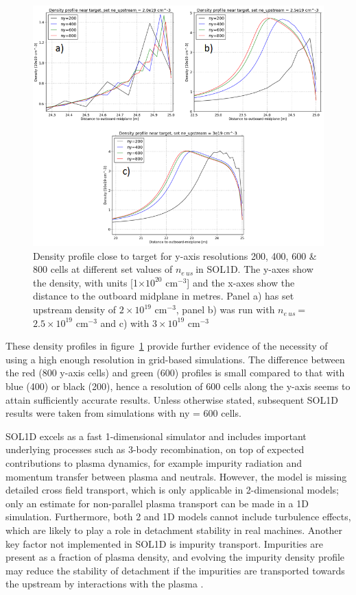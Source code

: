 \documentclass[12pt]{article}  %
\providecommand{\e}[1]{\ensuremath{\times 10^{#1}}} %
\providecommand{\noNe}[1]{{${#1}\times 10^{19}$ cm$^{-3}$}} %
\providecommand{\pow}[1]{{$^{#1}$}} %
\providecommand{\neus}{$n_{e~us}~$} %
\begin{document}
\begin{figure}
\includegraphics[scale=0.8]{Figures/sol1d/neprofneusALLtriang.png}
\centering
\caption{Density profile close to target for y-axis resolutions 200, 400, 600 \& 800 cells at different set values of \neus in SOL1D. The y-axes show the density, with units [1\e{20} cm\pow{-3}] and the x-axes show the distance to the outboard midplane in metres. Panel a) has set upstream density of \noNe{2}, panel b) was run with \neus = \noNe{2.5} and c) with \noNe{3}}\label{figneprofneusALLtriang}
\end{figure}

These density profiles in figure~\ref{figneprofneusALLtriang} provide further evidence of the necessity of using a high enough resolution in grid-based simulations. The difference between the red (800 y-axis cells) and green (600) profiles is small compared to that with blue (400) or black (200), hence a resolution of 600 cells along the y-axis seems to attain sufficiently accurate results. Unless otherwise stated, subsequent SOL1D results were taken from simulations with ny = 600 cells.

SOL1D excels as a fast 1-dimensional simulator and includes important underlying processes such as 3-body recombination, on top of expected contributions to plasma dynamics, for example impurity radiation and momentum transfer between plasma and neutrals. However, the model is missing detailed cross field transport, which is only applicable in 2-dimensional models; only an estimate for non-parallel plasma transport can be made in a 1D simulation. Furthermore, both 2 and 1D models cannot include turbulence effects, which are likely to play a role in detachment stability in real machines. Another key factor not implemented in SOL1D is impurity transport. Impurities are present as a fraction of plasma density, and evolving the impurity density profile may reduce the stability of detachment if the impurities are transported towards the upstream by interactions with the plasma \cite{Nakazawa2000}.
\end{document}

